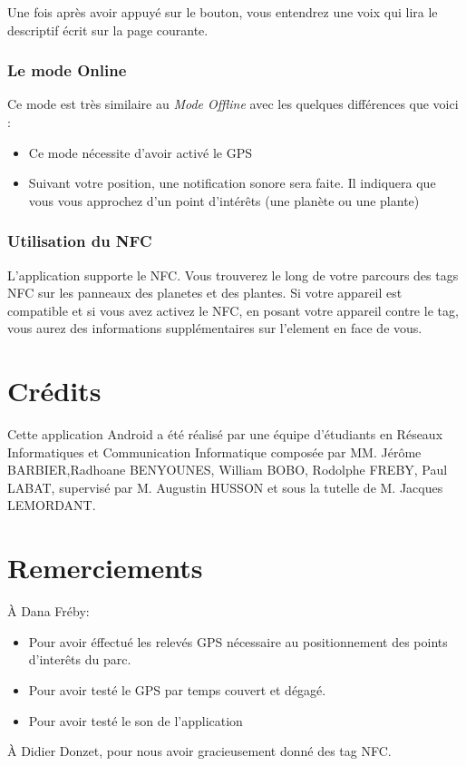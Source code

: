 \documentclass[a4paper,11pt]{article}
\begin{document}
    Une fois après avoir appuyé sur le bouton, vous entendrez une voix qui lira le descriptif écrit sur la page courante.
    
   \subsubsection{Le mode Online}
   Ce mode est très similaire au \textit{Mode Offline} avec les quelques différences que voici : 
   \begin{itemize}
    \item Ce mode nécessite d'avoir activé le GPS 
    \item Suivant votre position, une notification sonore sera faite. Il indiquera que vous vous approchez d'un point d'intérêts (une planète ou une plante)
   \end{itemize}

   \subsubsection*{Utilisation du NFC}
    L'application supporte le NFC. Vous trouverez le long de votre parcours des tags NFC sur les panneaux des planetes et des plantes.
      Si votre appareil est compatible et si vous avez activez le NFC, en posant votre appareil contre le tag, 
      vous aurez des informations supplémentaires sur l'element en face de vous.

   
    \section{Crédits}
    Cette application Android a été réalisé par une équipe d'étudiants en Réseaux Informatiques et Communication Informatique composée par 
    MM. Jérôme BARBIER,Radhoane BENYOUNES, William BOBO, Rodolphe FREBY, Paul LABAT, supervisé par M. Augustin HUSSON et sous la tutelle 
    de M. Jacques LEMORDANT.
    
    \section{Remerciements}
    À Dana Fréby:
    \begin{itemize}
     \item Pour avoir éffectué les relevés GPS nécessaire au positionnement des points d'interêts du parc.
     \item Pour avoir testé le GPS par temps couvert et dégagé. 
     \item Pour avoir testé le son de l'application
    \end{itemize}
    
  À Didier Donzet, pour nous avoir gracieusement donné des tag NFC.
\end{document}
